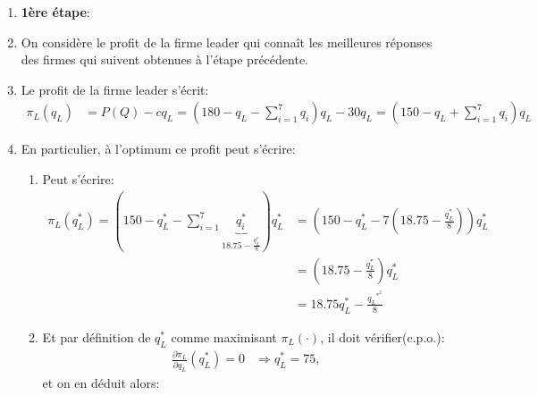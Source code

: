 \documentclass[notes, ignorenonframetext, compress, 10pt, xcolor=svgnames, aspectratio=169]{beamer}
\begin{document}
\begin{frame}[allowframebreaks]{\insertsection}
\begin{enumerate}[$\star$]
             \framebreak
             \item \textbf{1ère étape}:
             \item On considère le profit de la firme leader qui connaît les meilleures réponses des firmes 
             qui suivent obtenues à l'étape précédente.  
             \item Le profit de la firme leader s'écrit:
             \begin{align*}
                \pi_L(q_L) &= P(Q)-cq_L =  \left(180 -q_L - \sum_{i=1}^7 q_i\right)q_L - 30q_L 
                = \left(150 -q_L + \sum_{i=1}^7 q_i\right) q_L
             \end{align*}
             \item En particulier, à l'optimum ce profit peut s'écrire:
             \begin{enumerate}[$\star$]
                \item Peut s'écrire:
                \begin{align*}
                \pi_L(q_L^*) = \left(150 -q_L^* - \sum_{i=1}^7 \underbrace{q_i^*}_{18.75 -\frac{q_L^*}{8}}\right)q_L^* 
                &= \left(150 -q_L^* - 7\left(18.75 -\frac{q_L^*}{8}\right)\right)q_L^*\\
                &= \left(18.75-\frac{q_L^*}{8}\right)q_L^*\\
                &= 18.75q_L^* -\frac{q_L{^{*^2}}}{8}
               \end{align*}
               \item Et par définition de $q_L^*$ comme maximisant $\pi_L(\cdot)$, il doit vérifier(c.p.o.):  
               \begin{align*}
                \frac{\partial \pi_L}{\partial q_L}(q_L^*) = 0 &\Rightarrow q_L^* = 75,
               \end{align*}
               et on en déduit alors: 
               

\end{enumerate}
\end{enumerate}
\end{frame}
\end{document}
